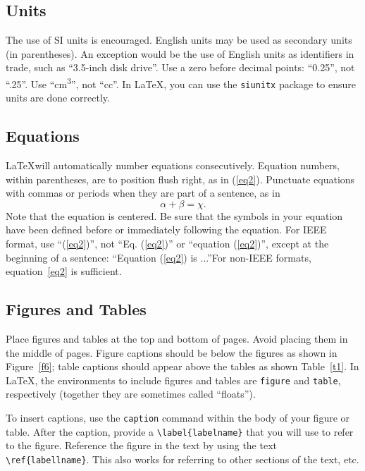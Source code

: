 \documentclass[10pt]{article}
\begin{document}
\subsection{Units}
The use of SI units is encouraged. English units may be used as secondary units (in parentheses). An exception would be the use of English units as identifiers in trade, such as ``3.5-inch disk drive''. Use a zero before decimal points: ``0.25'', not ``.25''. Use ``\si{\centi\meter\cubed}'', not ``cc''. In \LaTeX, you can use the \lstinline{siunitx} package to ensure units are done correctly. 

\subsection{Equations}
\LaTeX will automatically number equations consecutively. Equation numbers, within parentheses, are to position flush right, as in (\ref{eq2}). Punctuate equations with commas or periods when they are part of a sentence, as in
\begin{equation}
\alpha + \beta = \chi.
\label{eq2}
\end{equation}
Note that the equation is centered. Be sure that the symbols in your equation have been defined before or immediately following the equation. For IEEE format, use ``(\ref{eq2})'', not ``Eq. (\ref{eq2})'' or ``equation (\ref{eq2})'', except at the beginning of a sentence: ``Equation (\ref{eq2}) is ...''For non-IEEE formats, equation~\ref{eq2} is sufficient. 

\subsection{Figures and Tables}
Place figures and tables at the top and bottom of pages. Avoid placing them in the middle of pages. Figure captions should be below the figures as shown in Figure~\ref{f6}; table captions should appear above the tables as shown Table~\ref{t1}. In \LaTeX, the environments to include figures and tables are \lstinline{figure} and \lstinline{table}, respectively (together they are sometimes called ``floats''). 

To insert captions, use the \lstinline{caption} command within the body of your figure or table.  After the caption, provide a \lstinline|\label{labelname}| that you will use to refer to the figure.  Reference the figure in the text by using the text \lstinline|\ref{labellname}|.  This also works for referring to other sections of the text, etc. 
\end{document}
